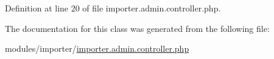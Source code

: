 Definition at line 20 of file importer.\-admin.\-controller.\-php.



The documentation for this class was generated from the following file\-:\begin{DoxyCompactItemize}
\item 
modules/importer/\hyperlink{importer_8admin_8controller_8php}{importer.\-admin.\-controller.\-php}\end{DoxyCompactItemize}
